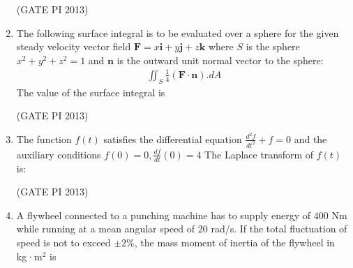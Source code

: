 \documentclass[journal,12pt,onecolumn]{IEEEtran}
\theoremstyle{remark}
\begin{document}
\begin{enumerate}
\hfill (GATE PI 2013)

\item The following surface integral is to be evaluated over a sphere for the given steady velocity vector field  
$
\mathbf{F} = x\mathbf{i} + y\mathbf{j} + z\mathbf{k}
$
where $S$ is the sphere $x^2 + y^2 + z^2 = 1$ and $\mathbf{n}$ is the outward unit normal vector to the sphere:
\begin{align*}
 \iint_S  \frac{1}{4}(\mathbf{F} \cdot \mathbf{n}). dA
\end{align*}
The value of the surface integral is
\begin{enumerate}
\end{enumerate}

\hfill (GATE PI 2013)


\item The function $f(t)$ satisfies the differential equation  
$
\frac{d^2 f}{dt^2} + f = 0
$
and the auxiliary conditions  
$
f(0) = 0 ,\frac{df}{dt}(0) = 4
$
The Laplace transform of $f(t)$ is:
\begin{enumerate}
\end{enumerate}
\hfill (GATE PI 2013)

\item A flywheel connected to a punching machine has to supply energy of $400$ Nm while running at a mean angular speed of $20$ rad/s. If the total fluctuation of speed is not to exceed $\pm 2\%$, the mass moment of inertia of the flywheel in kg·m$^2$ is
\begin{enumerate}
\end{enumerate}


\end{enumerate}
\end{document}
